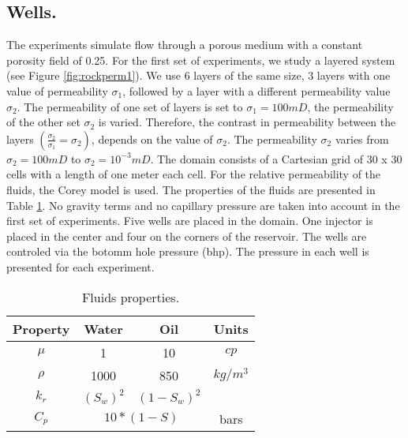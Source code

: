 \documentclass[12pt]{article}
\begin{document}
\subsection*{Wells.}
The experiments simulate flow through a porous medium with a constant porosity field of 0.25.
For the first set of experiments, we study a layered system (see Figure \ref{fig:rockperm1}). We use 6 layers of the same size, 
3 layers with one value of permeability $\sigma_1$, followed by a layer with a different permeability value $\sigma_2$. The permeability of one set of layers is set to $\sigma_1=100mD$, the permeability of the other set $\sigma_2$ is varied. 
Therefore, the contrast in permeability between the layers $(\frac{\sigma_2}{\sigma_1}=\sigma_2)$,
depends on the value of $\sigma_2$.
The permeability $\sigma_2$ varies from $\sigma_2=100mD$ to $\sigma_2=10^{-3}mD$. 
The domain consists of a Cartesian grid of 30 x 30 cells with a length of one meter each cell. For the relative permeability of the fluids, the Corey model is used. The properties of the fluids are presented in Table \ref{table:fluidsw}. No gravity terms and no capillary pressure are taken into account in the first set of experiments.
Five wells are placed in the domain. One injector is placed in the center and four on the corners of the reservoir. The wells are controled via the botomm hole pressure (bhp). The pressure in each well is presented for each experiment.
\begin{table}[!ht]
\hspace{1cm}
\begin{minipage}{.9\textwidth}%
\centering
\begin{tabular}{ |c|c|c|c|} 
\hline
Property&Water&Oil&Units\\
\hline
$\mu$&     1&    10 & $cp$  \\  
$\rho$& 1000& 850& $kg/m^3$\\
$k_r$&$(S_w)^2$&   $(1-S_w)^2$ &  \\
\hline
 $C_p$&\multicolumn{2}{|c|}{$10*(1-S)$}&bars\\
\hline
\end{tabular}
\caption{Fluids properties.}\label{table:fluidsw}
\end{minipage} \hspace{1cm} 
\end{table} 
\end{document}
